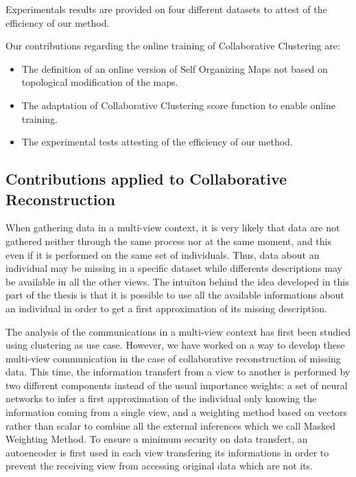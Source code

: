 Experimentals results are provided on four different datasets to attest of the efficiency of our method.

Our contributions regarding the online training of Collaborative Clustering are:
\begin{itemize}
    \item The definition of an online version of Self Organizing Maps not based on topological modification of the maps.
    \item The adaptation of Collaborative Clustering score function to enable online training.
    \item The experimental tests attesting of the efficiency of our method.
\end{itemize}

\subsection{Contributions applied to Collaborative Reconstruction}

When gathering data in a multi-view context, it is very likely that data are not gathered neither through the same process nor at the same moment, and this even if it is performed on the same set of individuals. Thus, data about an individual may be missing in a specific dataset while differents descriptions may be available in all the other views. The intuiton behind the idea developed in this part of the thesis is that it is possible to use all the available informations about an individual in order to get a first approximation of its missing description.

The analysis of the communications in a multi-view context has first been studied using clustering as use case. However, we have worked on a way to develop these multi-view communication in the case of collaborative reconstruction of missing data. This time, the information transfert from a view to another is performed by two different components instead of the usual importance weights: a set of neural networks to infer a first approximation of the individual only knowing the information coming from a single view, and a weighting method based on vectors rather than scalar to combine all the external inferences which we call Masked Weighting Method. To ensure a minimum security on data transfert, an autoencoder is first used in each view transfering its informations in order to prevent the receiving view from accessing original data which are not its.

